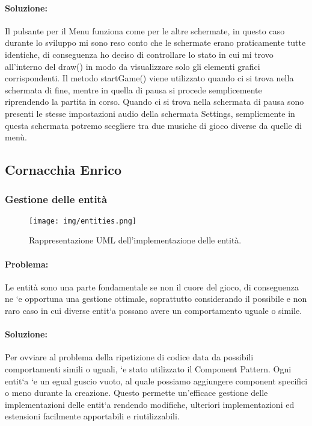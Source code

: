 \paragraph{Soluzione:}
Il pulsante per il Menu funziona come per le altre schermate, in questo caso durante lo sviluppo mi sono reso conto che le schermate erano praticamente tutte identiche, di conseguenza ho deciso di controllare lo stato in cui mi trovo all’interno del draw() in modo da visualizzare solo gli elementi grafici corrispondenti. Il metodo startGame() viene utilizzato quando ci si trova nella schermata di fine, mentre in quella di pausa si procede semplicemente riprendendo la partita in corso. Quando ci si trova nella schermata di pausa sono presenti le stesse impostazioni audio della schermata Settings, semplicmente in questa schermata potremo scegliere tra due musiche di gioco diverse da quelle di menù.



\subsection{Cornacchia Enrico}

\subsubsection{Gestione delle entità}

\begin{figure}[H]
\centering{}
\texttt{[image: img/entities.png]}
\caption{Rappresentazione UML dell'implementazione delle entità.}
\end{figure}

\paragraph{Problema:}
Le entità sono una parte fondamentale se non il cuore del gioco, di conseguenza ne `e opportuna una gestione ottimale, soprattutto considerando il possibile e non raro caso in cui diverse entit`a possano avere un comportamento uguale o simile.

\paragraph{Soluzione:}
Per ovviare al problema della ripetizione di codice data da possibili comportamenti simili o uguali, `e stato utilizzato il Component Pattern. Ogni entit`a `e un egual guscio vuoto, al quale possiamo aggiungere component specifici o meno durante la creazione. Questo permette un’efficace gestione delle implementazioni delle entit`a rendendo modifiche, ulteriori implementazioni ed estensioni facilmente apportabili e riutilizzabili.

